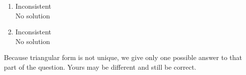 \begin{multicols}{2}
\begin{enumerate}
\setcounter{enumi}{\value{HW}}

\item  Inconsistent \\
No solution

\item   Inconsistent \\
No solution


\setcounter{HW}{\value{enumi}}
\end{enumerate}
\end{multicols}


Because triangular form is not unique, we give only one possible answer to that part of the question.  Yours may be different and still be correct.

